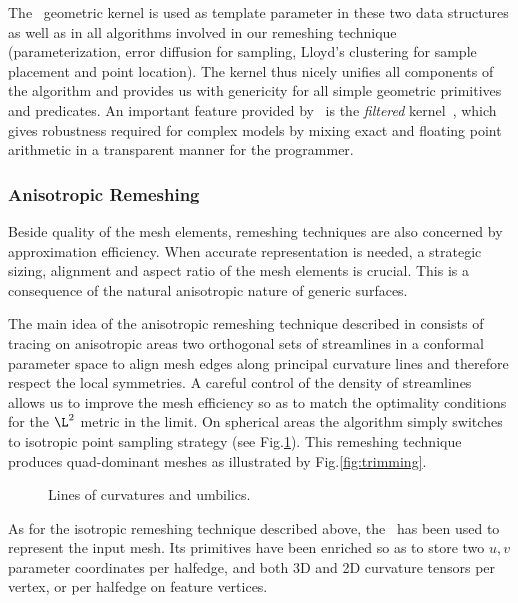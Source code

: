 The \cgal\ geometric kernel is used as template parameter in these two data
structures as well as in all algorithms involved in our remeshing
technique (parameterization, error diffusion for sampling, Lloyd's
clustering for sample placement and point location). The kernel thus
nicely unifies all components of the algorithm and provides us with
genericity for all simple geometric primitives and predicates. An
important feature provided by \cgal\ is the \emph{filtered}
kernel~\cite{bbp-iayed-01,p-iaeia-99}, which gives robustness required
for complex models by mixing exact and floating point arithmetic in a
transparent manner for the programmer.

\subsubsection{Anisotropic Remeshing}


Beside quality of the mesh elements, remeshing techniques are also
concerned by approximation efficiency. When accurate representation is
needed, a strategic sizing, alignment and aspect ratio of the mesh
elements is crucial. This is a consequence of the natural anisotropic
nature of generic surfaces.


The main idea of the anisotropic remeshing technique described in
\cite{acdld-apr-03} consists of tracing on anisotropic areas two 
orthogonal sets of streamlines in a conformal parameter space to align
mesh edges along principal curvature lines and therefore respect the
local symmetries. A careful control of the density of streamlines
allows us to improve the mesh efficiency so as to match the optimality
conditions for the $\L^2$ metric in the limit. On spherical areas the
algorithm simply switches to isotropic point sampling strategy (see
Fig.\ref{fig:anisotropic}). This remeshing technique produces
quad-dominant meshes as illustrated by Fig.\ref{fig:trimming}.

\begin{figure}
  \centering
  \caption{Lines of curvatures and umbilics.}
  \label{fig:anisotropic}
\end{figure}


As for the isotropic remeshing technique described above, the
\cgalpoly\ has been used to represent the input mesh. Its primitives
have been enriched so as to store two $u,v$ parameter coordinates per
halfedge, and both 3D and 2D curvature tensors per vertex, or per
halfedge on feature vertices.

